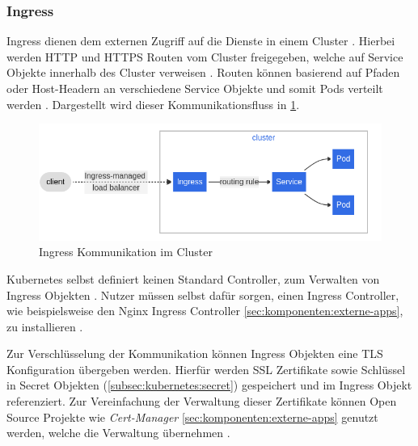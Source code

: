 \subsubsection{Ingress}
\label{subsec:kubernetes:ingress}
Ingress dienen dem externen Zugriff auf die Dienste in einem Cluster \cite{kubernetesIngress}.
Hierbei werden HTTP und HTTPS Routen vom Cluster freigegeben, 
welche auf Service Objekte innerhalb des Cluster verweisen \cite{kubernetesIngress}.
Routen können basierend auf Pfaden oder Host-Headern an verschiedene Service Objekte und somit Pods verteilt werden \cite{kubernetesIngress}.
Dargestellt wird dieser Kommunikationsfluss in \ref{fig:ingress_communication}.

\begin{figure}[h]
  \centering
  \includegraphics[width=\textwidth]{gfx/chapters/2_grundlagen/ingress.png}
  \caption{Ingress Kommunikation im Cluster}
  \label{fig:ingress_communication}
\end{figure}

Kubernetes selbst definiert keinen Standard Controller, zum Verwalten von Ingress Objekten \cite{Burns2019}.
Nutzer müssen selbst dafür sorgen, einen Ingress Controller, 
wie beispielsweise den Nginx Ingress Controller \ref{sec:komponenten:externe-apps}, zu installieren \cite{Burns2019}.

Zur Verschlüsselung der Kommunikation können Ingress Objekten eine TLS Konfiguration übergeben werden.
Hierfür werden SSL Zertifikate sowie Schlüssel in Secret Objekten (\ref{subsec:kubernetes:secret}) gespeichert und im
Ingress Objekt referenziert. 
Zur Vereinfachung der Verwaltung dieser Zertifikate können Open Source Projekte wie \emph{Cert-Manager} \ref{sec:komponenten:externe-apps}
genutzt werden, welche die Verwaltung übernehmen \cite{Burns2019}.